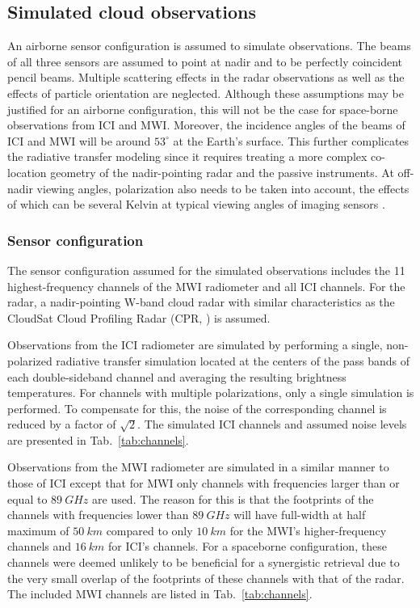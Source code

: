 \documentclass[journal abbreviation, manuscript]{copernicus}
\begin{document}
\subsection{Simulated cloud observations}

An airborne sensor configuration is assumed to simulate observations. The beams
of all three sensors are assumed to point at nadir and to be perfectly
coincident pencil beams. Multiple scattering effects in the radar observations
as well as the effects of particle orientation are neglected. Although these
assumptions may be justified for an airborne configuration, this will not be the
case for space-borne observations from ICI and MWI. Moreover, the incidence
angles of the beams of ICI and MWI will be around $53^\circ$ at the Earth's
surface. This further complicates the radiative transfer modeling since it
requires treating a more complex co-location geometry of the nadir-pointing
radar and the passive instruments. At off-nadir viewing angles, polarization
also needs to be taken into account, the effects of which can be several Kelvin
at typical viewing angles of imaging sensors \citep{xie15}.

\subsubsection{Sensor configuration}
\label{sec:sensors}
The sensor configuration assumed for the simulated observations includes the 11
highest-frequency channels of the MWI radiometer and all ICI channels. For the
radar, a nadir-pointing W-band cloud radar with similar characteristics as the
CloudSat Cloud Profiling Radar (CPR, \citet{stephens02,tanelli08}) is assumed.

Observations from the ICI radiometer are simulated by performing a single,
non-polarized radiative transfer simulation located at the centers of the pass
bands of each double-sideband channel and averaging the resulting brightness
temperatures. For channels with multiple polarizations, only a single simulation
is performed. To compensate for this, the noise of the corresponding channel is
reduced by a factor of $\sqrt{2}$. The simulated ICI channels and assumed noise
levels are presented in Tab.~\ref{tab:channels}.

Observations from the MWI radiometer are simulated in a similar manner to those
of ICI except that for MWI only channels with frequencies larger than or equal
to $89\ \unit{GHz}$ are used. The reason for this is that the footprints of the
channels with frequencies lower than $89\ \unit{GHz}$ will have full-width at
half maximum of $50\ \unit{km}$ compared to only $10\ \unit{km}$ for the MWI's
higher-frequency channels and $16\ \unit{km}$ for ICI's channels. For a
spaceborne configuration, these channels were deemed unlikely to be beneficial
for a synergistic retrieval due to the very small  overlap of the
footprints of these channels with that of the radar. The included MWI channels
are listed in Tab.~\ref{tab:channels}.
\end{document}
